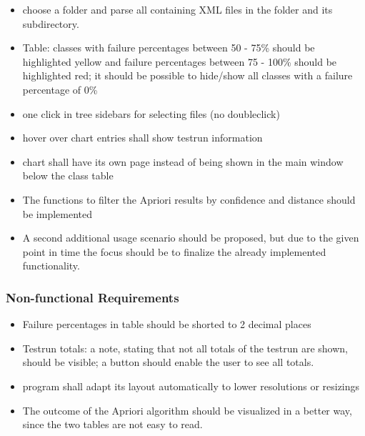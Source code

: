 \begin{itemize}

\item choose a folder and parse all containing XML files in the folder and its subdirectory.

\item Table: classes with failure percentages between 50 - 75\% should be highlighted yellow and failure percentages between 75 - 100\% should be highlighted red; it should be possible to hide/show all classes with a failure percentage of 0\%

\item one click in tree sidebars for selecting files (no doubleclick)
\item hover over chart entries shall show testrun information
\item chart shall have its own page instead of being shown in the main window below the class table
\item The functions to filter the Apriori results by confidence and distance should be implemented

\item A second additional usage scenario should be proposed, but due to the given point in time the focus should be to finalize the already implemented functionality.

\end{itemize}

\subsubsection{Non-functional Requirements}
\begin{itemize}

\item Failure percentages in table should be shorted to 2 decimal places
\item Testrun totals: a note, stating that not all totals of the testrun are shown, should be visible; a button should enable the user to see all totals.

\item program shall adapt its layout automatically to lower resolutions or resizings
\item The outcome of the Apriori algorithm should be visualized in a better way, since the two tables are not easy to read.
\end{itemize}